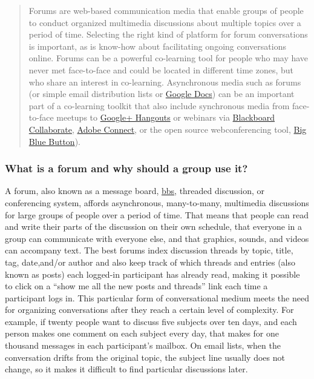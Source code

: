 %
\begin{quote}
Forums are web-based communication media that enable groups of people to
conduct organized multimedia discussions about multiple topics over a
period of time. Selecting the right kind of platform for forum
conversations is important, as is know-how about facilitating ongoing
conversations online. Forums can be a powerful co-learning tool for
people who may have never met face-to-face and could be located in
different time zones, but who share an interest in co-learning.
Asynchronous media such as forums (or simple email distribution lists or
\href{http://www.youtube.com/watch?v=VVFbqHhkb-k}{Google Docs}) can be
an important part of a co-learning toolkit that also include synchronous
media from face-to-face meetups to
\href{http://www.google.com/+/learnmore/hangouts/}{Google+ Hangouts} or
webinars via
\href{http://www.blackboard.com/Platforms/Collaborate/Products/Blackboard-Collaborate.aspx}{Blackboard
Collaborate},
\href{http://www.adobe.com/products/adobeconnect.html}{Adobe Connect},
or the open source webconferencing tool,
\href{http://www.bigbluebutton.org/}{Big Blue Button}).
\end{quote}

\subsubsection{What is a forum and why should a group use it?}

A forum, also known as a message board,
\href{http://en.wikipedia.org/wiki/Bulletin_board_system}{bbs}, threaded
discussion, or conferencing system, affords asynchronous, many-to-many,
multimedia discussions for large groups of people over a period of time.
That means that people can read and write their parts of the discussion
on their own schedule, that everyone in a group can communicate with
everyone else, and that graphics, sounds, and videos can accompany text.
The best forums index discussion threads by topic, title, tag,
date,and/or author and also keep track of which threads and entries
(also known as posts) each logged-in participant has already read,
making it possible to click on a ``show me all the new posts and
threads'' link each time a participant logs in. This particular form of
conversational medium meets the need for organizing conversations after
they reach a certain level of complexity. For example, if twenty people
want to discuss five subjects over ten days, and each person makes one
comment on each subject every day, that makes for one thousand messages
in each participant's mailbox. On email lists, when the conversation
drifts from the original topic, the subject line usually does not
change, so it makes it difficult to find particular discussions later.

